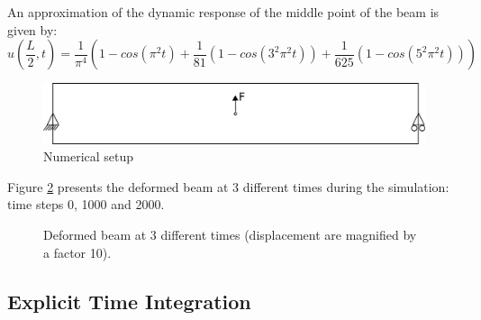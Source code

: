 An approximation of the dynamic response of the middle point of the
beam is given by:
\begin{equation}
  \label{eqn:smm:implicit}
  u\left(\frac{L}{2}, t\right)
  = \frac{1}{\pi^4} \left(1 - cos\left(\pi^2 t\right) +
    \frac{1}{81}\left(1 - cos\left(3^2 \pi^2 t\right)\right) +
    \frac{1}{625}\left(1 - cos\left(5^2 \pi^2 t\right)\right)\right)
\end{equation}

\begin{figure}[!htb]
  \centering
  \includegraphics[scale=.6]{figures/implicit_dynamic}
  \caption{Numerical setup}
  \label{fig:smm:implicit:dynamic}
\end{figure}

Figure \ref{fig:smm:implicit:dynamic_solution} presents the deformed
beam at 3 different times during the simulation: time steps 0, 1000 and
2000.

\begin{figure}[!htb]
  \centering
  \setlength{\unitlength}{0.1\textwidth}

  \caption{Deformed beam at 3 different times (displacement are
    magnified by a factor 10).}
  \label{fig:smm:implicit:dynamic_solution}
\end{figure}

\subsection{Explicit Time Integration}
\label{ssect:smm:expl-time-integr}


